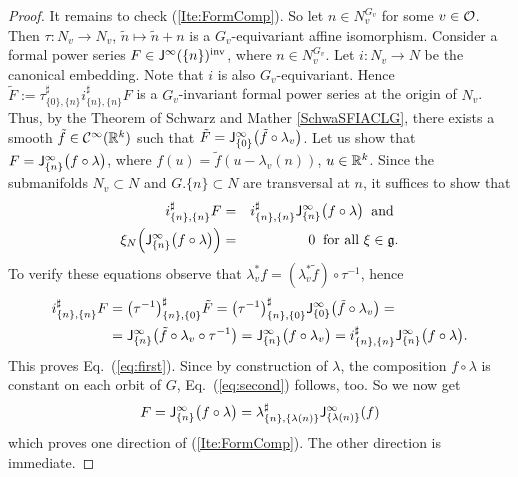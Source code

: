\begin{proof}
It remains to check (\ref{Ite:FormComp}). So let $n\in N_v^{G_v}$ for some $v\in \mathcal{O}$. 
Then $\tau : N_v \rightarrow N_v$, $\tilde n \mapsto \tilde n  + n$ is a $G_v$-equivariant
affine isomorphism.
Consider a formal power series $F\in \mathsf{J}^\infty (\{n\})^\textup{inv} $, where $n\in N_v^{G_v}$. 
Let $i: N_v \rightarrow N$ be the canonical embedding. Note that $i$ is also $G_v$-equivariant. 
Hence $\tilde F := \tau^{\sharp}_{\{0\},\{n\}} i^{\sharp}_{\{n\},\{n\}} F $ is a $G_v$-invariant formal power 
series at the origin of $N_v$. Thus, by the Theorem of Schwarz and Mather \ref{SchwaSFIACLG}, there exists a
smooth $\tilde f\in \mathcal{C}^\infty (\mathbb{R}^k)$ such that 
$\tilde F = \mathsf{J}^\infty_{\{ 0\}} \big( \tilde f\circ \lambda_v\big)$. 
Let us show that
$F = \mathsf{J}^\infty_{\{ n \}} \big( f \circ \lambda \big) $, where 
$f (u ) = \tilde f ( u -\lambda_v (n))$, $u\in \mathbb{R}^k$.  Since the submanifolds $N_v \subset N$ 
and $G.\{ n \} \subset N$ are transversal at $n$, it suffices to show that 
\begin{eqnarray}
  \label{eq:first}
   i^{\sharp}_{\{n\},\{n\}} F  & = & i^{\sharp}_{\{n\},\{n\}} \mathsf{J}^\infty_{\{ n \}} \big( f \circ \lambda \big) \: 
   \text{ and } \\
   \label{eq:second}
   \xi_N  \Big( \mathsf{J}^\infty_{\{ n \}} \big( f \circ \lambda \big)\Big) & = & 0 \:
  \text{ for all $\xi \in \mathfrak{g}$}. 
\end{eqnarray}
To verify these equations observe  that $\lambda_v^* f = (\lambda_v^*\tilde f )\circ \tau^{-1}$, hence 
\[
\begin{split}
   i^{\sharp}_{\{n\},\{n\}} F & = \big(\tau^{-1}\big)^{\sharp}_{\{ n \},\{0\}} \tilde F = 
   \big(\tau^{-1}\big)^{\sharp}_{\{ n \},\{0\}} \mathsf{J}^\infty_{\{ 0\}} \big( \tilde f\circ \lambda_v\big) = \\
    & = \mathsf{J}^\infty_{\{ n \}} \big( \tilde f\circ \lambda_v\circ \tau^{-1}\big) =
   \mathsf{J}^\infty_{\{ n \}} \big( f \circ \lambda_v \big) =
   i^{\sharp}_{\{n\},\{n\}} \mathsf{J}^\infty_{\{ n \}} \big( f \circ \lambda \big) . 
\end{split}
\]
This proves Eq.~(\ref{eq:first}). 
Since by construction of $\lambda$, the composition $f\circ \lambda$ is constant on each orbit 
of $G$, Eq.~(\ref{eq:second}) follows, too. 
So we now get 
\[ 
 F = \mathsf{J}^\infty_{\{ n \}} \big( f \circ \lambda \big) 
   =  \lambda^{\sharp}_{\{n\},\{\lambda(n)\}} \mathsf{J}^\infty_{\{ \lambda(n) \}} ( f )
\]
which proves one direction of (\ref{Ite:FormComp}). The other direction is immediate. 


\end{proof}
